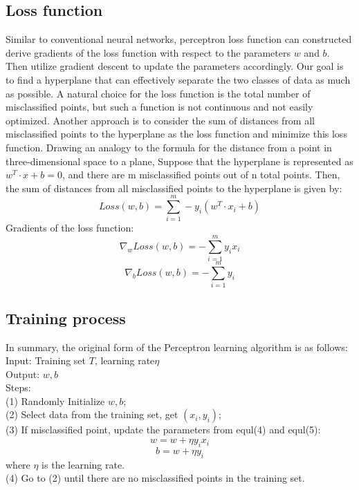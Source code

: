 \documentclass[10pt,twocolumn,letterpaper]{article}
\begin{document}
\subsection{Loss function}
Similar to conventional neural networks, perceptron loss function can constructed derive gradients of the loss function with respect to the parameters $w$ and $b$.
Then utilize gradient descent to update the parameters accordingly.\cite{widrow1960adaptiv} Our goal is to find a hyperplane that can effectively separate the two classes of data as much as possible. 
A natural choice for the loss function is the total number of misclassified points, but such a function is not continuous and not easily optimized. Another approach is to consider the sum of distances from all misclassified points to the hyperplane as the loss function and minimize this loss function. 
Drawing an analogy to the formula for the distance from a point in three-dimensional space to a plane, 
Suppose that the hyperplane is represented as $w^T\cdot x+b=0$, and there are m misclassified points out of n total points. Then, the sum of distances from all misclassified points to the hyperplane is given by:
\begin{equation}
  Loss(w,b)= \sum_{i=1}^{m}-y_i(w^T\cdot x_i+b)
\end{equation}
Gradients of the loss function:
\begin{equation}
  \nabla_w Loss(w,b) = -\sum_{i=1}^{m}y_i x_i
\end{equation}
\begin{equation}
  \nabla_b Loss(w,b) = -\sum_{i=1}^{m}y_i
\end{equation}


\subsection{Training process}
In summary, the original form of the Perceptron learning algorithm is as follows:\\
Input: Training set $T$, learning rate$\eta$\\
Output: ${w,b}$\\
Steps:\\
(1) Randomly Initialize $w,b$;\\
(2) Select data from the training set, get $(x_i,y_i)$;\\
(3) If misclassified point, update the parameters from equl(4) and equl(5):\\
\begin{equation}
  w = w + \eta y_i x_i
\end{equation}
\begin{equation}
  b = w + \eta y_i
\end{equation}
where $\eta$ is the learning rate.\\
(4) Go to (2) until there are no misclassified points in the training set.\\
\end{document}

